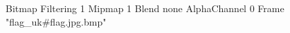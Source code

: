{Bitmap
	{Filtering 1}
	{Mipmap 1}
	{Blend none}
	{AlphaChannel 0}
	{Frame "flag_uk#flag.jpg.bmp"}
}
